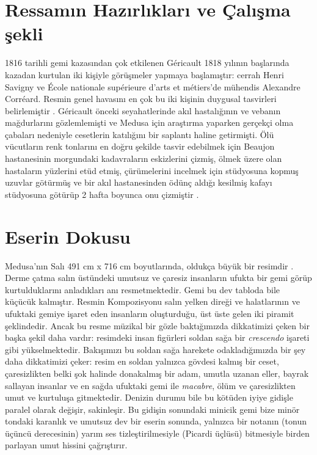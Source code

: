\documentclass{report}
\begin{document}
\section*{Ressamın Hazırlıkları ve Çalışma şekli}
1816 tarihli gemi kazasından çok etkilenen Géricault 1818 yılının başlarında kazadan kurtulan iki kişiyle görüşmeler yapmaya başlamıştır: cerrah Henri Savigny ve École nationale supérieure d'arts et métiers'de mühendis Alexandre Corréard.
Resmin genel havasını en çok bu iki kişinin duygusal tasvirleri belirlemiştir \citep{riding2003}.
Géricault önceki seyahatlerinde akıl hastalığının ve vebanın mağdurlarını gözlemlemişti ve Medusa için araştırma yaparken gerçekçi olma çabaları nedeniyle cesetlerin katılığını bir saplantı haline getirmişti.
Ölü vücutların renk tonlarını en doğru şekilde tasvir edebilmek için Beaujon hastanesinin morgundaki kadavraların eskizlerini çizmiş, ölmek üzere olan hastaların yüzlerini etüd etmiş, çürümelerini incelmek için stüdyosuna kopmuş uzuvlar götürmüş ve bir akıl hastanesinden ödünç aldığı kesilmiş kafayı stüdyosuna götürüp 2 hafta boyunca onu çizmiştir \citep{trapp1976}.

\section*{Eserin Dokusu}
Medusa'nın Salı 491 cm x 716 cm boyutlarında, oldukça büyük bir resimdir \citep{louvre2024}.
Derme çatma salın üstündeki umutsuz ve çaresiz insanların ufukta bir gemi görüp kurtulduklarını anladıkları anı resmetmektedir.
Gemi bu dev tabloda bile küçücük kalmıştır.
Resmin Kompozisyonu salın yelken direği ve halatlarının ve ufuktaki gemiye işaret eden insanların oluşturduğu, üst üste gelen iki piramit şeklindedir.
Ancak bu resme müzikal bir gözle baktığımızda dikkatimizi çeken bir başka şekil daha vardır: resimdeki insan figürleri soldan sağa bir \textit{crescendo} işareti gibi yükselmektedir.
Bakışımızı bu soldan sağa harekete odakladığımızda bir şey daha dikkatimizi çeker: resim en soldan yalnızca gövdesi kalmış bir ceset, çaresizlikten belki şok halinde donakalmış bir adam, umutla uzanan eller, bayrak sallayan insanlar ve en sağda ufuktaki gemi ile \textit{macabre}, ölüm ve çaresizlikten umut ve kurtuluşa gitmektedir.
Denizin durumu bile bu kötüden iyiye gidişle paralel olarak değişir, sakinleşir.
Bu gidişin sonundaki minicik gemi bize minör tondaki karanlık ve umutsuz dev bir eserin sonunda, yalnızca bir notanın (tonun üçüncü derecesinin) yarım ses tizleştirilmesiyle (Picardi üçlüsü) bitmesiyle birden parlayan umut hissini çağrıştırır.
\end{document}
